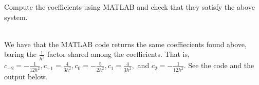 Compute the coefficients using MATLAB and check that they satisfy the above system.\\


\begin{solution}\renewcommand{\qedsymbol}{}\ \\
    We have that the MATLAB code returns the same coeffiecients found above, baring the $\frac{1}{h^2}$
    factor shared among the coefficients. That is,
    $c_{-2}=-\frac{1}{12h^2}, c_{-1}=\frac{4}{3h^2}, c_0=-\frac{5}{2h^2}, c_1=\frac{4}{3h^2},$ and
    $c_2=-\frac{1}{12h^2}$. See the code and the output below.

\end{solution}